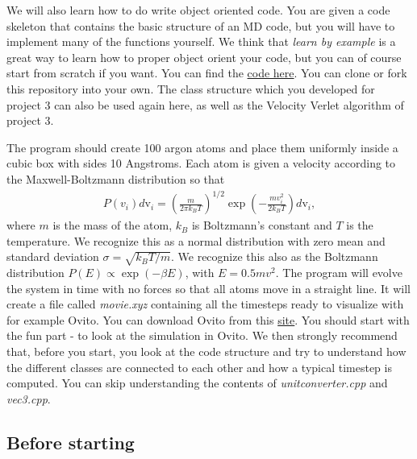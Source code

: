 \documentclass[%
oneside,                 %
final,                   %
10pt]{article}
\begin{document}
We will also learn how to do write object oriented code. You are given
a code skeleton that contains the basic structure of an MD code, but
you will have to implement many of the functions yourself. We think
that \emph{learn by example} is a great way to learn how to proper
object orient your code, but you can of course start from scratch if
you want. You can find the \href{{https://github.com/andeplane/molecular-dynamics-fys3150}}{code
here}. You
can clone or fork this repository into your own.  The class structure
which you developed for project 3 can also be used again here, as well
as the Velocity Verlet algorithm of project 3.


The program should create 100 argon atoms
and place them uniformly inside a cubic box with sides 10
Angstroms. Each atom is given a velocity according to the
Maxwell-Boltzmann distribution so that
\begin{align} 
P(v_i)d\mathrm{v}_i = \left(\frac{m}{2\pi k_B
T}\right)^{1/2} \exp\left(-\frac{m v_i^2}{2k_B T}\right)d\mathrm{v}_i,
\end{align} 
where $m$ is the mass of the atom, $k_B$ is
Boltzmann's constant and $T$ is the temperature. We recognize this as
a normal distribution with zero mean and standard deviation $\sigma =
\sqrt{k_B T/m}$. We recognize this also as the Boltzmann distribution $P(E) \propto \exp{(-\beta E)}$, with $E = 0.5mv^2$.
The program will evolve the system in time with no
forces so that all atoms move in a straight line. It will create a
file called \emph{movie.xyz} containing all the timesteps ready to
visualize with for example Ovito. You can download Ovito from this \href{{http://www.ovito.org/index.php/download}}{site}. You should start
with the fun part - to look at the simulation in Ovito. We then
strongly recommend that, before you start, you look at the code
structure and try to understand how the different classes are
connected to each other and how a typical timestep is computed. You
can skip understanding the contents of \emph{unitconverter.cpp} and \emph{vec3.cpp}.



\subsection*{Before starting}
\end{document}
